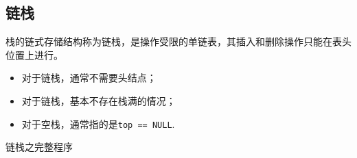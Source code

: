 \subsection{链栈}
\begin{frame}[fragile]\ft{\subsecname}
\begin{dingyi}
栈的链式存储结构称为链栈，是操作受限的单链表，其插入和删除操作只能在表头位置上进行。
\end{dingyi}
\end{frame}

\begin{frame}[fragile]\ft{\subsecname}

\end{frame}
%
%
\begin{frame}[fragile]\ft{\subsecname}
\begin{itemize}
\item 对于链栈，通常不需要头结点；\\[0.1in]
\item 对于链栈，基本不存在栈满的情况；\\[0.1in]
\item 对于空栈，通常指的是{\tt top == NULL}.
\end{itemize}
\end{frame}
%




\begin{frame}
\begin{center}
\textcolor{acolor5}{\Large 链栈之完整程序}
\end{center}
\end{frame}
%




\begin{frame}

\end{frame}



\begin{frame}[fragile]

\end{frame}
%
\begin{frame}[fragile]

\end{frame}
%
\begin{frame}[fragile]

\end{frame}
%
\begin{frame}[fragile]

\end{frame}
%
\begin{frame}[fragile]

\end{frame}
